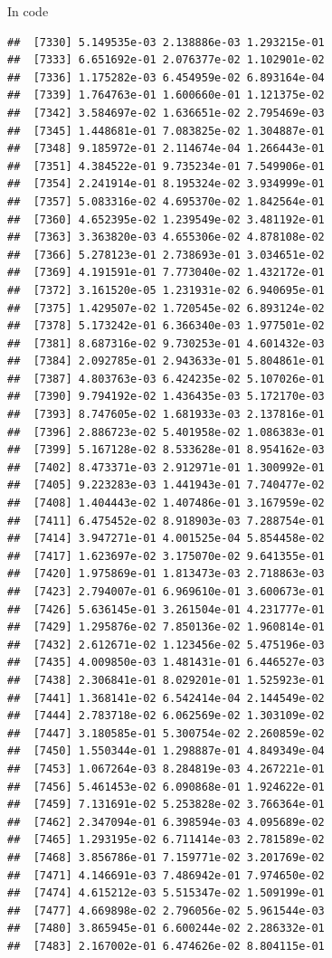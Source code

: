 \documentclass[ignorenonframetext,]{beamer}
\begin{document}
\begin{frame}[fragile]{In code}
\begin{verbatim}
##  [7330] 5.149535e-03 2.138886e-03 1.293215e-01
##  [7333] 6.651692e-01 2.076377e-02 1.102901e-02
##  [7336] 1.175282e-03 6.454959e-02 6.893164e-04
##  [7339] 1.764763e-01 1.600660e-01 1.121375e-02
##  [7342] 3.584697e-02 1.636651e-02 2.795469e-03
##  [7345] 1.448681e-01 7.083825e-02 1.304887e-01
##  [7348] 9.185972e-01 2.114674e-04 1.266443e-01
##  [7351] 4.384522e-01 9.735234e-01 7.549906e-01
##  [7354] 2.241914e-01 8.195324e-02 3.934999e-01
##  [7357] 5.083316e-02 4.695370e-02 1.842564e-01
##  [7360] 4.652395e-02 1.239549e-02 3.481192e-01
##  [7363] 3.363820e-03 4.655306e-02 4.878108e-02
##  [7366] 5.278123e-01 2.738693e-01 3.034651e-02
##  [7369] 4.191591e-01 7.773040e-02 1.432172e-01
##  [7372] 3.161520e-05 1.231931e-02 6.940695e-01
##  [7375] 1.429507e-02 1.720545e-02 6.893124e-02
##  [7378] 5.173242e-01 6.366340e-03 1.977501e-02
##  [7381] 8.687316e-02 9.730253e-01 4.601432e-03
##  [7384] 2.092785e-01 2.943633e-01 5.804861e-01
##  [7387] 4.803763e-03 6.424235e-02 5.107026e-01
##  [7390] 9.794192e-02 1.436435e-03 5.172170e-03
##  [7393] 8.747605e-02 1.681933e-03 2.137816e-01
##  [7396] 2.886723e-02 5.401958e-02 1.086383e-01
##  [7399] 5.167128e-02 8.533628e-01 8.954162e-03
##  [7402] 8.473371e-03 2.912971e-01 1.300992e-01
##  [7405] 9.223283e-03 1.441943e-01 7.740477e-02
##  [7408] 1.404443e-02 1.407486e-01 3.167959e-02
##  [7411] 6.475452e-02 8.918903e-03 7.288754e-01
##  [7414] 3.947271e-01 4.001525e-04 5.854458e-02
##  [7417] 1.623697e-02 3.175070e-02 9.641355e-01
##  [7420] 1.975869e-01 1.813473e-03 2.718863e-03
##  [7423] 2.794007e-01 6.969610e-01 3.600673e-01
##  [7426] 5.636145e-01 3.261504e-01 4.231777e-01
##  [7429] 1.295876e-02 7.850136e-02 1.960814e-01
##  [7432] 2.612671e-02 1.123456e-02 5.475196e-03
##  [7435] 4.009850e-03 1.481431e-01 6.446527e-03
##  [7438] 2.306841e-01 8.029201e-01 1.525923e-01
##  [7441] 1.368141e-02 6.542414e-04 2.144549e-02
##  [7444] 2.783718e-02 6.062569e-02 1.303109e-02
##  [7447] 3.180585e-01 5.300754e-02 2.260859e-02
##  [7450] 1.550344e-01 1.298887e-01 4.849349e-04
##  [7453] 1.067264e-03 8.284819e-03 4.267221e-01
##  [7456] 5.461453e-02 6.090868e-01 1.924622e-01
##  [7459] 7.131691e-02 5.253828e-02 3.766364e-01
##  [7462] 2.347094e-01 6.398594e-03 4.095689e-02
##  [7465] 1.293195e-02 6.711414e-03 2.781589e-02
##  [7468] 3.856786e-01 7.159771e-02 3.201769e-02
##  [7471] 4.146691e-03 7.486942e-01 7.974650e-02
##  [7474] 4.615212e-03 5.515347e-02 1.509199e-01
##  [7477] 4.669898e-02 2.796056e-02 5.961544e-03
##  [7480] 3.865945e-01 6.600244e-02 2.286332e-01
##  [7483] 2.167002e-01 6.474626e-02 8.804115e-01

\end{verbatim}
\end{frame}
\end{document}
